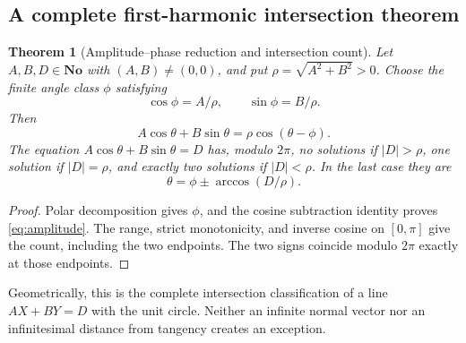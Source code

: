 \documentclass[11pt]{article}
\numberwithin{equation}{section}
\newtheorem{theorem}{Theorem}[section]
\theoremstyle{definition}
\newcommand{\No}{\mathbf{No}}
\begin{document}
\subsection{A complete first-harmonic intersection theorem}
\begin{theorem}[Amplitude--phase reduction and intersection count]\label{thm:amplitude}
Let $A,B,D\in\No$ with $(A,B)\ne(0,0)$, and put $\rho=\sqrt{A^2+B^2}>0$. Choose the finite angle class $\phi$ satisfying
\[
 \cos\phi=A/\rho,\qquad \sin\phi=B/\rho.
\]
Then
\begin{equation}\label{eq:amplitude}
 A\cos\theta+B\sin\theta=\rho\cos(\theta-\phi).
\end{equation}
The equation $A\cos\theta+B\sin\theta=D$ has, modulo $2\pi$, no solutions if $|D|>\rho$, one solution if $|D|=\rho$, and exactly two solutions if $|D|<\rho$. In the last case they are
\[
 \theta=\phi\pm\arccos(D/\rho).
\]
\end{theorem}
\begin{proof}
Polar decomposition gives $\phi$, and the cosine subtraction identity proves \eqref{eq:amplitude}. The range, strict monotonicity, and inverse cosine on $[0,\pi]$ give the count, including the two endpoints. The two signs coincide modulo $2\pi$ exactly at those endpoints.
\end{proof}
Geometrically, this is the complete intersection classification of a line $AX+BY=D$ with the unit circle. Neither an infinite normal vector nor an infinitesimal distance from tangency creates an exception.
\end{document}
